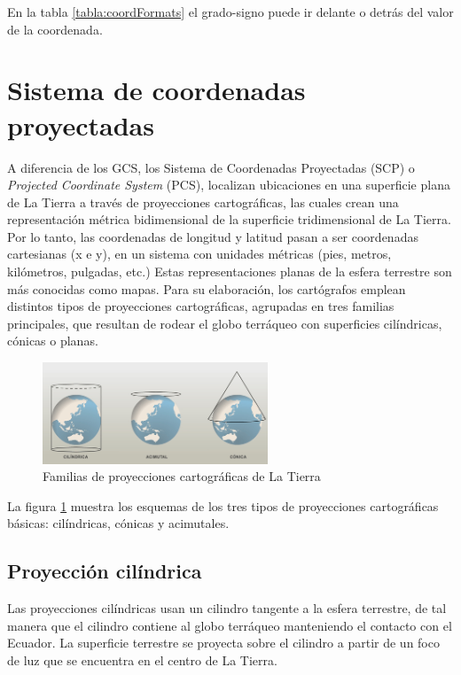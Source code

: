 En la tabla \ref{tabla:coordFormats} el grado-signo puede ir delante o detrás del valor de la coordenada.

\section{Sistema de coordenadas proyectadas}

A diferencia de los GCS, los Sistema de Coordenadas Proyectadas (SCP) o \textit{Projected Coordinate System} (PCS),
localizan ubicaciones en una superficie plana de La Tierra a través de proyecciones cartográficas,
las cuales crean una representación métrica bidimensional de la superficie tridimensional de La Tierra.
Por lo tanto, las coordenadas de longitud y latitud pasan a ser coordenadas cartesianas (x e y), en un sistema con unidades métricas (pies, metros, kilómetros, pulgadas, etc.)
Estas representaciones planas de la esfera terrestre son más conocidas como mapas. Para su elaboración, los cartógrafos emplean distintos tipos de proyecciones cartográficas, agrupadas en tres familias principales, 
que resultan de rodear el globo terráqueo con superficies cilíndricas, cónicas o planas.

\begin{figure}[H]
  \centering
  \includegraphics[width=0.60\textwidth]{Imagenes/CRS/proyecciones.png}
  \caption{Familias de proyecciones cartográficas de La Tierra} \label{fig:proyecciones}
\end{figure}

La figura \ref{fig:proyecciones} muestra los esquemas de los tres tipos de proyecciones cartográficas básicas: cilíndricas, cónicas y acimutales.

\subsection{Proyección cilíndrica}
Las proyecciones cilíndricas usan un cilindro tangente a la esfera terrestre, de tal manera que el cilindro contiene al globo terráqueo manteniendo el contacto con el Ecuador. 
La superficie terrestre se proyecta sobre el cilindro a partir de un foco de luz que se encuentra en el centro de La Tierra.


